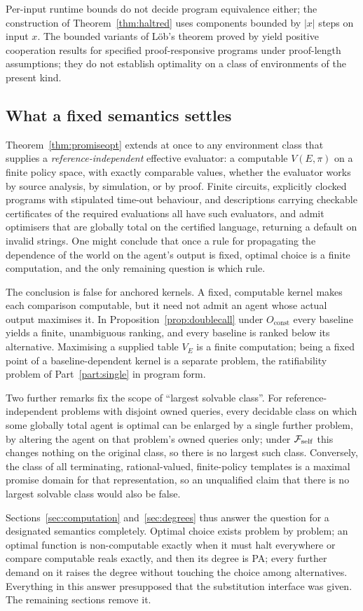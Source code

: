 Per-input runtime bounds do not decide program equivalence either; the construction of
Theorem~\ref{thm:haltred} uses components bounded by $|x|$ steps on input $x$. The bounded variants
of Löb's theorem proved by \textcite{critch2019} yield positive cooperation results for specified
proof-responsive programs under proof-length assumptions; they do not establish optimality on a
class of environments of the present kind.

\subsection{What a fixed semantics settles}\label{sec:fixedsemantics}

Theorem~\ref{thm:promiseopt} extends at once to any environment class that supplies a
\emph{reference-independent} effective evaluator: a computable $V(E,\pi)$ on a finite policy space,
with exactly comparable values, whether the evaluator works by source analysis, by simulation, or by
proof. Finite circuits, explicitly clocked programs with stipulated time-out behaviour, and
descriptions carrying checkable certificates of the required evaluations all have such evaluators,
and admit optimisers that are globally total on the certified language, returning a default on
invalid strings. One might conclude that once a rule for propagating the dependence of the world on
the agent's output is fixed, optimal choice is a finite computation, and the only remaining question
is which rule.

The conclusion is false for anchored kernels. A fixed, computable kernel makes each comparison
computable, but it need not admit an agent whose actual output maximises it. In
Proposition~\ref{prop:doublecall} under $O_{\mathrm{const}}$ every baseline yields a finite,
unambiguous ranking, and every baseline is ranked below its alternative. Maximising a supplied table
$V_E$ is a finite computation; being a fixed point of a baseline-dependent kernel is a separate
problem, the ratifiability problem of Part~\ref{part:single} in program form.

Two further remarks fix the scope of \enquote{largest solvable class}. For reference-independent
problems with disjoint owned queries, every decidable class on which some globally total agent is
optimal can be enlarged by a single further problem, by altering the agent on that problem's owned
queries only; under $\mathcal{F}_{\mathrm{self}}$ this changes nothing on the original class, so there is
no largest such class. Conversely, the class of all terminating, rational-valued, finite-policy
templates is a maximal promise domain for that representation, so an unqualified claim that there is
no largest solvable class would also be false.

Sections~\ref{sec:computation} and~\ref{sec:degrees} thus answer the question for a designated
semantics completely. Optimal choice exists problem by problem; an optimal function is
non-computable exactly when it must halt everywhere or compare computable reals exactly, and then its
degree is PA; every further demand on it raises the degree without touching the choice among
alternatives. Everything in this answer presupposed that the substitution interface was given. The
remaining sections remove it.
